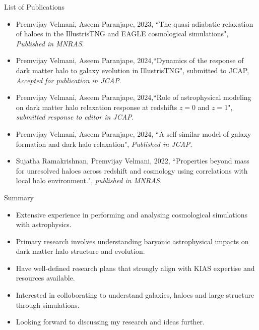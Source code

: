 \documentclass{beamer}
\begin{document}
\begin{frame}{List of Publications}
\begin{itemize}
    \item Premvijay Velmani, Aseem Paranjape, 2023, ``The quasi-adiabatic relaxation of haloes in the IllustrisTNG and EAGLE cosmological simulations", \textit{Published in MNRAS}.
    \item Premvijay Velmani, Aseem Paranjape, 2024,``Dynamics of the response of dark matter halo to galaxy evolution in IllustrisTNG", submitted to JCAP, \textit{Accepted for publication in JCAP}.
    \item Premvijay Velmani, Aseem Paranjape, 2024,``Role of astrophysical modeling on dark matter halo relaxation response at redshifts $z = 0$ and $z = 1$", \textit{submitted response to editor in JCAP}.
    \item Premvijay Velmani, Aseem Paranjape, 2024, ``A self-similar model of galaxy formation and dark halo relaxation", \textit{Published in JCAP}.
    \item Sujatha Ramakrishnan, Premvijay Velmani, 2022, ``Properties beyond mass for unresolved haloes across redshift and cosmology using correlations with local halo environment.", \textit{published in MNRAS}.
\end{itemize}
\end{frame}

\begin{frame}{Summary}
    \begin{itemize}
        \item Extensive experience in performing and analysing cosmological simulations with astrophysics.
        \item Primary research involves understanding baryonic astrophysical impacts on dark matter halo structure and evolution.
        \item Have well-defined research plans that strongly align with KIAS expertise and resources available.
        \item Interested in colloborating to understand galaxies, haloes and large structure through simulations.
        \item Looking forward to discussing my research and ideas further.
    \end{itemize}
\end{frame}




        

\end{document}

